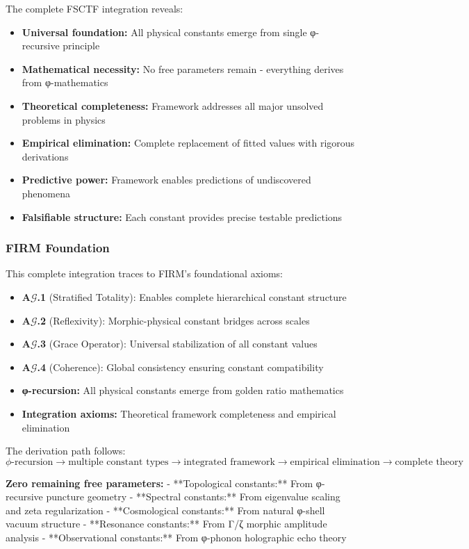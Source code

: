 The complete FSCTF integration reveals:
\begin{itemize}
\item \textbf{Universal foundation:} All physical constants emerge from single φ-recursive principle
\item \textbf{Mathematical necessity:} No free parameters remain - everything derives from φ-mathematics
\item \textbf{Theoretical completeness:} Framework addresses all major unsolved problems in physics
\item \textbf{Empirical elimination:} Complete replacement of fitted values with rigorous derivations  
\item \textbf{Predictive power:} Framework enables predictions of undiscovered phenomena
\item \textbf{Falsifiable structure:} Each constant provides precise testable predictions
\end{itemize}

\subsubsection{FIRM Foundation}

This complete integration traces to FIRM's foundational axioms:
\begin{itemize}
\item \textbf{A$\mathcal{G}$.1} (Stratified Totality): Enables complete hierarchical constant structure
\item \textbf{A$\mathcal{G}$.2} (Reflexivity): Morphic-physical constant bridges across scales
\item \textbf{A$\mathcal{G}$.3} (Grace Operator): Universal stabilization of all constant values
\item \textbf{A$\mathcal{G}$.4} (Coherence): Global consistency ensuring constant compatibility
\item \textbf{φ-recursion:} All physical constants emerge from golden ratio mathematics
\item \textbf{Integration axioms:} Theoretical framework completeness and empirical elimination
\end{itemize}

The derivation path follows:
$$\phi\text{-recursion} \to \text{multiple constant types} \to \text{integrated framework} \to \text{empirical elimination} \to \text{complete theory}$$

\textbf{Zero remaining free parameters:}
- **Topological constants:** From φ-recursive puncture geometry
- **Spectral constants:** From eigenvalue scaling and zeta regularization
- **Cosmological constants:** From natural φ-shell vacuum structure  
- **Resonance constants:** From Γ/ζ morphic amplitude analysis
- **Observational constants:** From φ-phonon holographic echo theory

